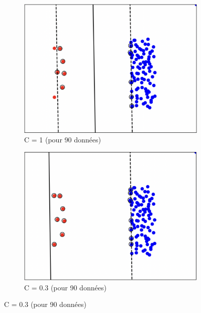 \documentclass[a4paper,12pt]{article}
\begin{document}
\begin{figure}[H]
    \centering
    \begin{subfigure}[b]{0.45\textwidth}
        \centering
        \includegraphics[width=\textwidth]{Images/C=1.png}
        \caption{C = 1 (pour 90 données)}
    \end{subfigure}
    \hfill
    \begin{subfigure}[b]{0.45\textwidth}
        \centering
        \includegraphics[width=\textwidth]{Images/C=0.3.png}
        \caption{C = 0.3 (pour 90 données)}
    \end{subfigure}


\end{figure}
\end{document}
